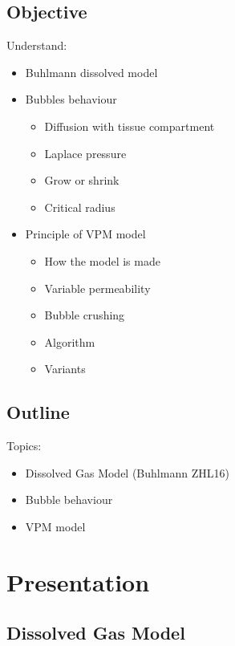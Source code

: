 \documentclass[aspectratio=1610,english,14pt]{beamer}
\begin{document}
\subsection{Objective}
\begin{frame}{\insertsubsection}
	Understand:
	\begin{itemize}
		\item Buhlmann dissolved model
		\item Bubbles behaviour
		\begin{itemize}
			\item Diffusion with tissue compartment
			\item Laplace pressure
			\item Grow or shrink
			\item Critical radius
		\end{itemize}
		\item Principle of VPM model
		\begin{itemize}
			\item How the model is made
			\item Variable permeability
			\item Bubble crushing
			\item Algorithm
			\item Variants
		\end{itemize}
	\end{itemize}
\end{frame}

\subsection{Outline}
\begin{frame}{\insertsubsection}
	Topics:
	\begin{itemize}
		\item Dissolved Gas Model (Buhlmann ZHL16)
		\item Bubble behaviour
		\item VPM model
	\end{itemize}
\end{frame}

\section{Presentation}

\subsection{Dissolved Gas Model}
	\begin{frame}
		\resizebox{!}{18pt}{\strut\textbf{\insertsubsection}\strut}\\
		\vfill
   \end{frame}
\end{document}
